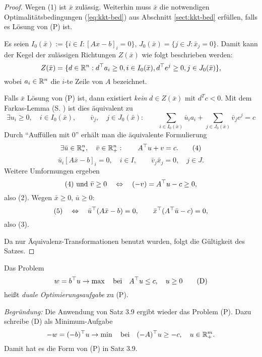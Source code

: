 \begin{proof}
  Wegen (1) ist $\bar{x}$ zulässig. Weiterhin muss $\bar{x}$ die notwendigen
  Optimalitätsbedingungen (\ref{eq:kkt-bed}) aus Abschnitt \ref{sect:kkt-bed}
  erfüllen, falls es Lösung von (P) ist.

  Es seien $I_0(\bar{x}) := \{ i \in I : [Ax - b]_i = 0 \}$, $J_0(\bar{x}) = \{
  j \in J : \bar{x}_j = 0 \}$. Damit kann der Kegel der zulässigen Richtungen
  $Z(\bar{x})$ wie folgt beschrieben werden:
  \[ Z(\bar{x}) = \{ d \in \mathbb{R}^n : d^\top a_i \ge 0, i \in I_0(\bar{x}),
    d^\top e^j \ge 0, j \in J_0(\bar{x}) \}, \]
  wobei $a_i \in \mathbb{R}^n$ die $i$-te Zeile von $A$ bezeichnet.

  Falls $\bar{x}$ Lösung von (P) ist, dann existiert \emph{kein} $d \in
  Z(\bar{x})$ mit $d^T c < 0$. Mit dem Farkas-Lemma (S. \pageref{lem:farkas})
  ist dies äquivalent zu
  \[ \exists u_i \ge 0, \quad i \in I_0 (\bar{x}), \qquad
    \bar{v}_j, \quad j \in J_0(\bar{x}) : \qquad 
    \sum_{i \in I_0(\bar{x})} \bar{u}_i a_i + \sum_{j \in J_0(\bar{x})} \bar{v}_j
    e^j = c \]
  Durch ``Auffüllen mit 0'' erhält man die äquivalente Formulierung
  \[ \exists \bar{u} \in \mathbb{R}^n_*, \quad
    \bar{v} \in \mathbb{R}^n_+: \qquad
    A^\top u + v = c. \tag{4} \]
  \[ \bar{u}_i [A \bar{x} - b ]_i = 0, \quad i \in I, \qquad
    \bar{v}_j \bar{x}_j = 0, \quad j \in J. \tag{5} \]
  Weitere Umformungen ergeben
  \[ (4) \text{ und } \bar{v} \ge 0 \quad \Leftrightarrow \quad
    (-v) = A^\top u - c \ge 0, \]
  also (2). Wegen $\bar{x} \ge 0$, $\bar{u} \ge 0$:
  \[ (5) \quad \Leftrightarrow \quad \bar{u}^\top (A \bar{x} - b) = 0, \qquad
    \bar{x}^\top (A^\top \bar{u} - c) = 0, \]
  also (3).

  Da nur Äquivalenz-Transformationen benutzt wurden, folgt die Gültigkeit des
  Satzes.
\end{proof}

\begin{defn}
  Das Problem
  \[ w = b^\top u \to \max \quad \text{bei} \quad A^\top u \le c, \quad u
    \ge 0 \tag{D} \]
  heißt \emph{duale Optimierungsaufgabe} zu (P).
\end{defn}

\emph{Begründung:} Die Anwendung von Satz 3.9 ergibt wieder das Problem (P).
Dazu schreibe (D) als Minimum-Aufgabe
\[ -w = (-b)^\top u \to \min \quad \text{bei} \quad (-A)^\top u \ge -c, \quad u \in
  \mathbb{R}^m_+. \]
Damit hat es die Form von (P) in Satz 3.9.

